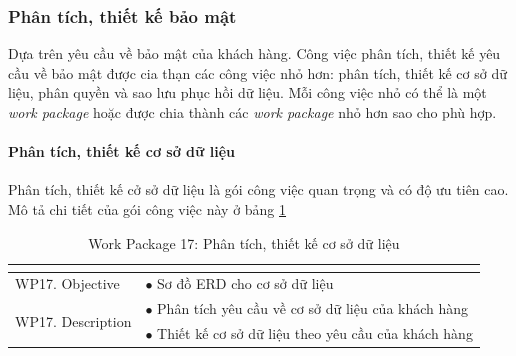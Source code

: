 \documentclass[a4paper]{book}
\begin{document}
\subsubsection{Phân tích, thiết kế bảo mật}
Dựa trên yêu cầu về bảo mật của khách hàng. Công việc phân tích, thiết kế yêu cầu về bảo mật được cia thạn các công việc nhỏ hơn: phân tích, thiết kế cơ sở dữ liệu, phân quyền và sao lưu phục hồi dữ liệu. Mỗi công việc nhỏ có thể là một \textit{work package} hoặc được chia thành các \textit{work package} nhỏ hơn sao cho phù hợp.
\paragraph{Phân tích, thiết kế cơ sở dữ liệu} Phân tích, thiết kế cở sở dữ liệu là gói công việc quan trọng và có độ ưu tiên cao. Mô tả chi tiết của gói công việc này ở bảng \ref{table:baomat_thietke_csdl}
\begin{table}[h!]
	\begin{center}
		\begin{tabular}{|p{4cm}|p{10cm}|}
			\hline
			\multicolumn{2}{|c|}{\cellcolor[HTML]{363636}{\color[HTML]{FFFFFF}Work package 17: Phân tích, thiết kế cơ sở dữ liệu}}\\
			\hline
			\multirow{1}{*}{WP17. Objective} & $\bullet$ Sơ đồ ERD cho cơ sở dữ liệu\\
			\hline
			\multirow{2}{*}{WP17. Description} & $\bullet$ Phân tích yêu cầu về cơ sở dữ liệu của khách hàng \\
			& $\bullet$ Thiết kế cơ sở dữ liệu theo yêu cầu của khách hàng\\
			\hline
		\end{tabular}
		\caption{Work Package 17: Phân tích, thiết kế cơ sở dữ liệu}
		\label{table:baomat_thietke_csdl}
	\end{center}
\end{table}
\end{document}
